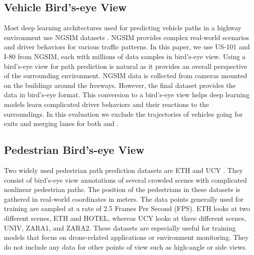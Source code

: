 \documentclass[sigconf]{acmart}
\begin{document}
\subsection{Vehicle Bird's-eye View}


Most deep learning architectures used for predicting vehicle paths in a highway environment \cite{CSlstm18, highway2022, congestion2021} use NGSIM datasets \cite{NGSIM_i80, NGSIM_US101}. NGSIM provides complex real-world scenarios and driver behaviors for various traffic patterns. In this paper, we use US-101 \cite{NGSIM_US101} and I-80 \cite{NGSIM_i80} from NGSIM, each with millions of data samples in bird's-eye view. Using a bird's-eye view for path prediction is natural as it provides an overall perspective of the surrounding environment. NGSIM data is collected from cameras mounted on the buildings around the freeways. However, the final dataset provides the data in bird's-eye format. This conversion to a bird's-eye view helps deep learning models learn complicated driver behaviors and their reactions to the surroundings. In this evaluation we exclude the trajectories of vehicles going for exits and merging lanes for both \cite{NGSIM_i80} and \cite{NGSIM_US101}.



\subsection{Pedestrian Bird's-eye View}
Two widely used pedestrian path prediction datasets are ETH \cite{pellegrini2009you} and UCY \cite{lerner2007crowds}. They consist of bird's-eye view annotations of several crowded scenes with complicated nonlinear pedestrian paths. The position of the pedestrians in these datasets is gathered in real-world coordinates in meters. The data points generally used for training are sampled at a rate of 2.5 Frames Per Second (FPS). ETH looks at two different scenes, ETH and HOTEL, whereas UCY looks at three different scenes, UNIV, ZARA1, and ZARA2. These datasets are especially useful for training models that focus on drone-related applications or environment monitoring. They do not include any data for other points of view such as high-angle or side views.
\end{document}
